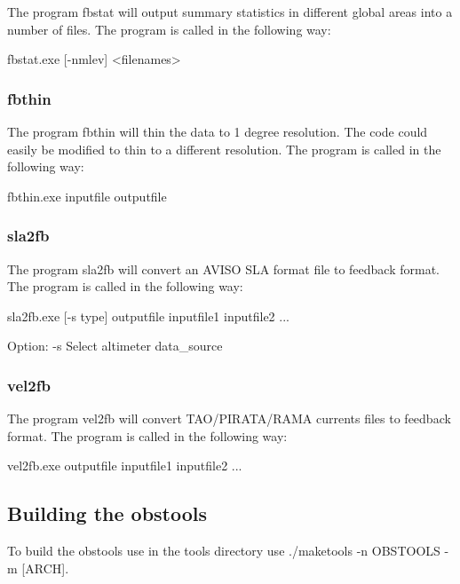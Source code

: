 \documentclass[../tex_main/NEMO_manual]{subfiles}
\begin{document}
The program fbstat will output summary statistics in different global areas into a number of files.
The program is called in the following way:

\footnotesize
\begin{cmds}
fbstat.exe [-nmlev] <filenames>
\end{cmds}

\subsubsection{fbthin}

The program fbthin will thin the data to 1 degree resolution.
The code could easily be modified to thin to a different resolution.
The program is called in the following way:

\footnotesize
\begin{cmds}
fbthin.exe inputfile outputfile
\end{cmds}

\subsubsection{sla2fb}

The program sla2fb will convert an AVISO SLA format file to feedback format.
The program is called in the following way:

\footnotesize
\begin{cmds}
sla2fb.exe [-s type] outputfile inputfile1 inputfile2 ...

Option:
     -s            Select altimeter data_source
\end{cmds}

\subsubsection{vel2fb}

The program vel2fb will convert TAO/PIRATA/RAMA currents files to feedback format.
The program is called in the following way:

\footnotesize
\begin{cmds}
vel2fb.exe outputfile inputfile1 inputfile2 ...
\end{cmds}

\subsection{Building the obstools}

To build the obstools use in the tools directory use ./maketools -n OBSTOOLS -m [ARCH].
\end{document}

